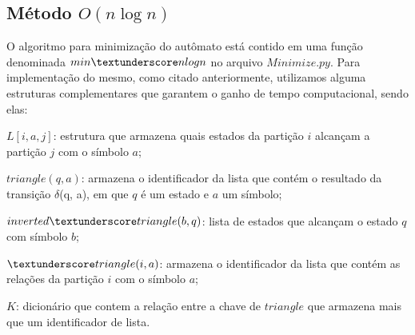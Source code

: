 \documentclass[12pt]{article}
\begin{document}
\subsection{Método $O(n \log{} n)$}
O algoritmo para minimização do autômato está contido em uma função denominada $min\textunderscore nlogn$ no arquivo $Minimize.py$. Para implementação do mesmo, como citado anteriormente, utilizamos alguma estruturas complementares que garantem o ganho de tempo computacional, sendo elas: 

$L[i, a, j]$: estrutura que armazena quais estados da partição $i$ alcançam a partição $j$ com o símbolo $a$;

$triangle(q, a)$: armazena o identificador da lista que contém o resultado da transição $\delta$(q, a), em que $q$ é um estado e $a$ um símbolo;

$inverted\textunderscore triangle(b, q)$: lista de estados que alcançam o estado $q$ com símbolo $b$;

$\textunderscore triangle(i, a)$: armazena o identificador da lista que contém as relações da partição $i$ com o símbolo $a$;

$K$: dicionário que contem a relação entre a chave de \textunderscore $triangle$ que armazena mais que um identificador de lista.
\end{document}
